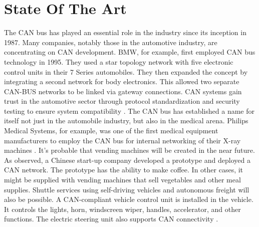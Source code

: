 
\section{State Of The Art}
The CAN bus has played an essential role in the industry since its inception in 1987. Many companies, notably those in the automotive industry, are concentrating on CAN development. BMW, for example, first employed CAN bus technology in 1995. They used a star topology network with five electronic control units in their 7 Series automobiles. They then expanded the concept by integrating a second network for body electronics. This allowed two separate CAN-BUS networks to be linked via gateway connections. CAN systems gain trust in the automotive sector through protocol standardization and security testing to ensure system compatibility \cite{b5}. The CAN bus has established a name for itself not just in the automobile industry, but also in the medical arena. Philips Medical Systems, for example, was one of the first medical equipment manufacturers to employ the CAN bus for internal networking of their X-ray machines \cite{b6}. It's probable that vending machines will be created in the near future. As observed, a Chinese start-up company developed a prototype and deployed a CAN network. The prototype has the ability to make coffee. In other cases, it might be supplied with vending machines that sell vegetables and other meal supplies. Shuttle services using self-driving vehicles and autonomous freight will also be possible. A CAN-compliant vehicle control unit is installed in the vehicle. It controls the lights, horn, windscreen wiper, handles, accelerator, and other functions. The electric steering unit also supports CAN connectivity \cite{b7}.